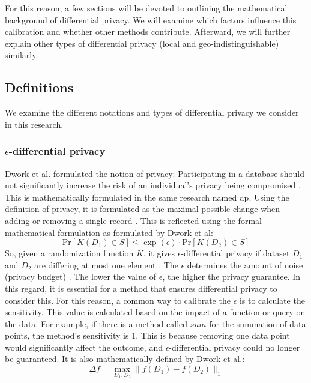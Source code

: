 For this reason, a few sections will be devoted to outlining the mathematical background of differential privacy.
We will examine which factors influence this calibration and whether other methods contribute.
Afterward, we will further explain other types of differential privacy (local and geo-indistinguishable) similarly.


\newpage
\subsection{Definitions}
We examine the different notations and types of differential privacy we consider in this research.

\subsubsection{$\epsilon$-differential privacy}
Dwork et al. formulated the notion of privacy: Participating in a database should not significantly increase the risk of an individual's privacy being compromised \cite{dwork_differential_2006}.
This is mathematically formulated in the same research named \gls{dp}.
Using the definition of privacy, it is formulated as the maximal possible change when adding or removing a single record \citep{dwork_differential_2006, friedman_data_2010}.
This is reflected using the formal mathematical formulation as formulated by Dwork et al:
\begin{equation}
  {\mathrm{Pr}}[K(D_{1})\in S]\leq\exp(\epsilon) \cdot {\mathrm{Pr}}[K(D_{2})\in S]
  \label{pure-dp}
\end{equation}
So, given a randomization function $K$, it gives $\epsilon$-differential privacy if dataset $D_1$ and $D_2$ are differing at most one element \citep{dwork_differential_2006}.
The $\epsilon$ determines the amount of noise (privacy budget) \citep{friedman_data_2010}.
The lower the value of $\epsilon$, the higher the privacy guarantee.
In this regard, it is essential for a method that ensures differential privacy to consider this.
For this reason, a common way to calibrate the $\epsilon$ is to calculate the sensitivity.
This value is calculated based on the impact of a function or query on the data.
For example, if there is a method called $sum$ for the summation of data points, the method's sensitivity is 1.
This is because removing one data point would significantly affect the outcome, and $\epsilon$-differential privacy could no longer be guaranteed.
It is also mathematically defined by Dwork et al.:
\begin{equation}
  \Delta f=\operatorname*{max}_{D_{1},D_{2}}\|f(D_{1})-f(D_{2})\|_{1}
  \label{sensitivity-dp}
\end{equation}
